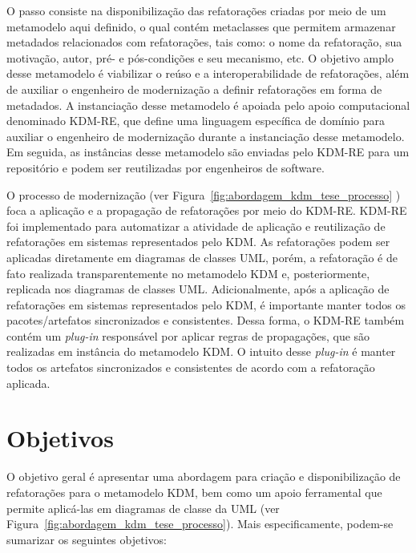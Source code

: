 O passo  consiste na disponibilização das refatorações criadas por meio de um metamodelo aqui definido, o qual contém metaclasses que permitem armazenar metadados relacionados com refatorações, tais como: o nome da refatoração, sua motivação, autor, pré- e pós-condições e seu mecanismo, etc. O objetivo amplo desse metamodelo é viabilizar o reúso e a interoperabilidade de refatorações, além de auxiliar o engenheiro de modernização a definir refatorações em forma de metadados. A instanciação desse metamodelo é apoiada pelo apoio computacional denominado KDM-RE, que define uma linguagem específica de domínio para auxiliar o engenheiro de modernização durante a instanciação desse metamodelo. Em seguida, as instâncias desse metamodelo são enviadas pelo KDM-RE para um repositório e podem ser reutilizadas por engenheiros de software. 


O processo de modernização (ver Figura~\ref{fig:abordagem_kdm_tese_processo} ) foca a aplicação e a propagação de refatorações por meio do KDM-RE. KDM-RE foi implementado para automatizar a atividade de aplicação e reutilização de refatorações em sistemas representados pelo KDM. As refatorações podem ser aplicadas diretamente em diagramas de classes UML, porém, a refatoração é de fato realizada transparentemente no metamodelo KDM e, posteriormente, replicada nos diagramas de classes UML. Adicionalmente, após a aplicação de refatorações em sistemas representados pelo KDM, é importante manter todos os pacotes/artefatos sincronizados e consistentes. Dessa forma, o KDM-RE também contém um \textit{plug-in} responsável por aplicar regras de propagações, que são realizadas em instância do metamodelo KDM. O intuito desse \textit{plug-in} é manter todos os artefatos sincronizados e consistentes de acordo com a refatoração aplicada.


\section{Objetivos}\label{sec:objetivos}


O objetivo geral é apresentar uma abordagem para criação e disponibilização de refatorações para o metamodelo KDM, bem como um apoio ferramental que permite aplicá-las em diagramas de classe da UML (ver Figura~\ref{fig:abordagem_kdm_tese_processo}). Mais especificamente, podem-se sumarizar os seguintes objetivos:%

